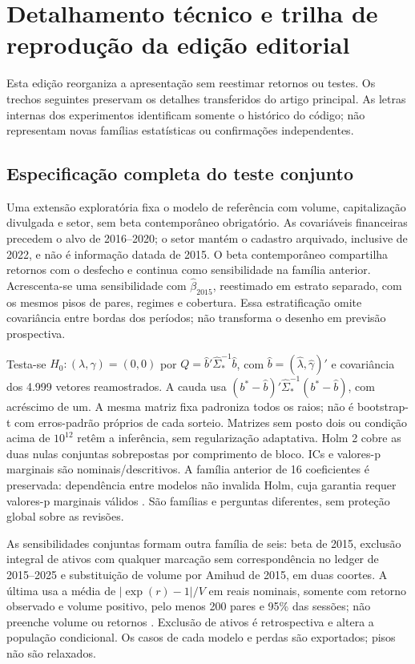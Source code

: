 \documentclass[12 pt]{article}
\begin{document}
\section{Detalhamento técnico e trilha de reprodução da edição editorial}
Esta edição reorganiza a apresentação sem reestimar retornos ou testes.
Os trechos seguintes preservam os detalhes transferidos do artigo principal.
As letras internas dos experimentos identificam somente o histórico do código;
não representam novas famílias estatísticas ou confirmações independentes.

\subsection{Especificação completa do teste conjunto}
Uma extensão exploratória fixa o modelo de referência com volume,
capitalização divulgada e setor, sem beta contemporâneo obrigatório.
As covariáveis financeiras precedem o alvo de 2016--2020; o setor mantém
o cadastro arquivado, inclusive de 2022, e não é informação datada de 2015.
O beta contemporâneo compartilha retornos com o desfecho e continua
como sensibilidade na família anterior. Acrescenta-se uma sensibilidade
com $\widehat\beta_{2015}$, reestimado em estrato separado, com os mesmos
pisos de pares, regimes e cobertura. Essa estratificação omite covariância
entre bordas dos períodos; não transforma o desenho em previsão prospectiva.

Testa-se $H_0:(\lambda,\gamma)=(0,0)$ por
$Q=\widehat b'\widehat\Sigma_*^{-1}\widehat b$, com
$\widehat b=(\widehat\lambda,\widehat\gamma)'$ e covariância dos
4.999 vetores reamostrados. A cauda usa
$(b^*-\widehat b)'\widehat\Sigma_*^{-1}(b^*-\widehat b)$, com acréscimo
de um. A mesma matriz fixa padroniza todos os raios; não é bootstrap-t
com erros-padrão próprios de cada sorteio. Matrizes sem posto dois ou
condição acima de $10^{12}$ retêm a inferência, sem regularização adaptativa.
Holm 2 cobre as duas nulas conjuntas sobrepostas por comprimento de bloco.
ICs e valores-p marginais são nominais/descritivos. A família anterior
de 16 coeficientes é preservada: dependência entre modelos não invalida
Holm, cuja garantia requer valores-p marginais válidos \cite{holm1979}.
São famílias e perguntas diferentes, sem proteção global sobre as revisões.

As sensibilidades conjuntas formam outra família de seis: beta de 2015,
exclusão integral de ativos com qualquer marcação sem correspondência
no ledger de 2015--2025 e substituição de volume por Amihud de 2015,
em duas coortes. A última usa a média de $|\exp(r)-1|/V$ em reais nominais,
somente com retorno observado e volume positivo, pelo menos 200 pares
e 95\% das sessões; não preenche volume ou retornos \cite{amihud2002}.
Exclusão de ativos é retrospectiva e altera a população condicional.
Os casos de cada modelo e perdas são exportados; pisos não são relaxados.
\end{document}
